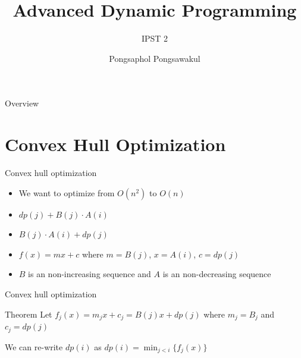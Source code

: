 \documentclass[aspectratio=169,xcolor=dvipsnames]{beamer}
\title[short title]{Advanced Dynamic Programming} %
\subtitle{IPST 2}
\author[Pin-Yen] {Pongsaphol Pongsawakul}
\date{} %
\begin{document}
\begin{frame}[plain]
    \titlepage
\end{frame}

\begin{frame}[plain]{Overview}
    \tableofcontents
\end{frame}

\section{Convex Hull Optimization}

\begin{frame}[plain]{Convex hull optimization}
    \begin{itemize}
        \begin{block}{Equation}
        $dp(i) = \displaystyle\min_{j<i}\{dp(j)+B(j)\cdot A(i)\}$ where $B(x) \geq B(x+1)$ and $A(x) \leq A(x+1)$ for all $x$
        \end{block}
        \item<2-> We want to optimize from $O(n^2)$ to $O(n)$
        \item<3-> $dp(j)+B(j)\cdot A(i)$
        \item<3-> $B(j)\cdot A(i) + dp(j)$
        \item<4-> $f(x) = mx+c$ where $m = B(j)$, $x = A(i)$, $c = dp(j)$
        \item<5-> $B$ is an non-increasing sequence and $A$ is an non-decreasing sequence
    \end{itemize}
\end{frame}

\begin{frame}[plain]{Convex hull optimization}

    \begin{block}{Theorem}
    Let $f_j(x) = m_jx + c_j = B(j)x + dp(j)$ where $m_j = B_j$ and $c_j = dp(j)$
        
    We can re-write $dp(i)$ as $dp(i) = \displaystyle\min_{j<i}\{f_j(x)\}$
    \end{block}
\end{frame}
\end{document}
